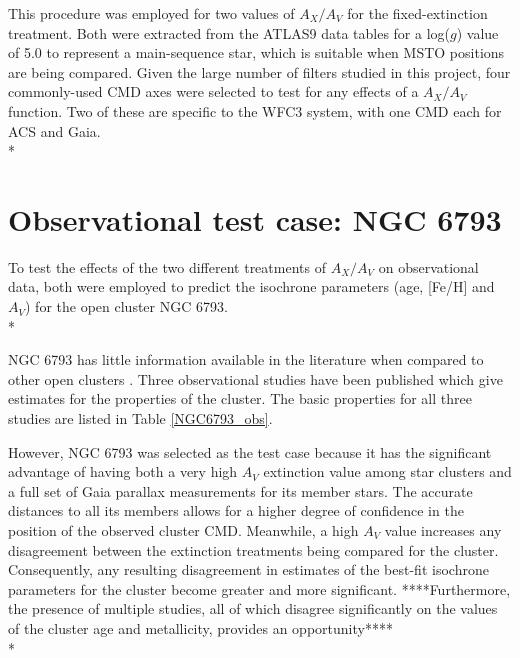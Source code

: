\documentclass[12pt, a4paper]{report}
\begin{document}
This procedure was employed for two values of $A_{X}/A_{V}$ for the fixed-extinction treatment. Both were extracted from the ATLAS9 data tables for a log($g$) value of 5.0 to represent a main-sequence star, which is suitable when MSTO positions are being compared. Given the large number of filters studied in this project, four commonly-used CMD axes were selected to test for any effects of a $A_{X}/A_{V}$ function. Two of these are specific to the WFC3 system, with one CMD each for ACS and Gaia.\\*

\section{Observational test case: NGC 6793} \label{obs_ngc_section}
To test the effects of the two different treatments of $A_{X}/A_{V}$ on observational data, both were employed to predict the isochrone parameters (age, [Fe/H] and $A_{V}$) for the open cluster NGC 6793.\\*

NGC 6793 has little information available in the literature when compared to other open clusters \citep{2019A&A...623A.108B}. Three observational studies have been published which give estimates for the properties of the cluster. The basic properties for all three studies are listed in Table \ref{NGC6793_obs}.

However, NGC 6793 was selected as the test case because it has the significant advantage of having both a very high $A_{V}$ extinction value among star clusters and a full set of Gaia parallax measurements for its member stars. The accurate distances to all its members allows for a higher degree of confidence in the position of the observed cluster CMD. Meanwhile, a high $A_{V}$ value increases any disagreement between the extinction treatments being compared for the cluster. Consequently, any resulting disagreement in estimates of the best-fit isochrone parameters for the cluster become greater and more significant. ****Furthermore, the presence of multiple studies, all of which disagree significantly on the values of the cluster age and metallicity, provides an opportunity****  \\*
\end{document}
